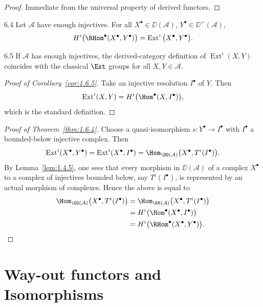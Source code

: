 \begin{proof}
Immediate from the universal property of derived functors.
\end{proof}

\begin{booktheorem}[Yoneda]{6.4}\label{thm:1.6.4}
Let $\mathcal{A}$ have enough injectives.
For all $X^\bullet\in\DD(\mathcal{A})$, $Y^\bullet\in\DD^+(\mathcal{A})$,
\[
H^i\big(\RHom^\bullet(X^\bullet,Y^\bullet)\big)
= \operatorname{Ext}^i\big(X^\bullet,Y^\bullet\big).
\]
\end{booktheorem}

\begin{bookcorollary}{6.5}\label{cor:1.6.5}
If $\mathcal{A}$ has enough injectives, the derived-category definition of $\operatorname{Ext}^i(X,Y)$
coincides with the classical $\Ext$ groups for all $X,Y\in\mathcal{A}$.
\end{bookcorollary}

\begin{proof}[Proof of Corollary~\ref{cor:1.6.5}]
Take an injective resolution $I^\bullet$ of $Y$. Then
\[
\operatorname{Ext}^i(X,Y) = H^i\big(\Hom^\bullet(X,I^\bullet)\big),
\]
which is the standard definition.
\end{proof}

\begin{proof}[Proof of Theorem~\ref{thm:1.6.4}]
Choose a quasi-isomorphism $s\colon Y^\bullet\to I^\bullet$ with $I^\bullet$ a bounded-below injective complex. Then
\[
\operatorname{Ext}^i(X^\bullet,Y^\bullet)
= \operatorname{Ext}^i(X^\bullet,I^\bullet)
= \Hom_{\DD(\mathcal{A})}\big(X^\bullet,T^i(I^\bullet)\big).
\]
By Lemma~\ref{lem:1.4.5}, one sees that every morphism in $\DD(\mathcal{A})$ of
a complex $X^\bullet$ to a complex of injectives bounded below, say $T^i(I^\bullet)$,
is represented by an actual morphism of complexes. Hence the above
is equal to
\[
\begin{aligned}
\Hom_{\DD(\mathcal{A})}\big(X^\bullet,T^i(I^\bullet)\big)
&= \Hom_{\KK(\mathcal{A})}\big(X^\bullet,T^i(I^\bullet)\big) \\
&= H^i\big(\Hom^\bullet(X^\bullet,I^\bullet)\big) \\
&= H^i\big(\RHom^\bullet(X^\bullet,Y^\bullet)\big).
\end{aligned}
\]
\end{proof}

\section{Way-out functors and Isomorphisms}\label{sec:1.7}

